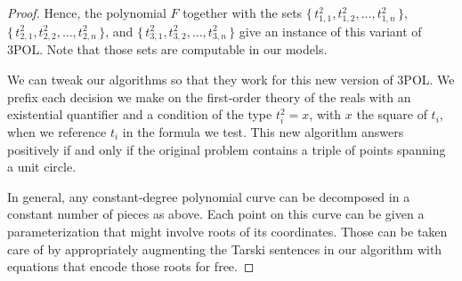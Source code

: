 \begin{proof}
	Hence, the polynomial \(F\) together with
	the sets
	$\{\,t_{1,1}^2,t_{1,2}^2,\ldots,t_{1,n}^2\,\}$,
	$\{\,t_{2,1}^2,t_{2,2}^2,\ldots,t_{2,n}^2\,\}$, and
	$\{\,t_{3,1}^2,t_{3,2}^2,\ldots,t_{3,n}^2\,\}$
	give an instance of this variant of 3POL\@.
	Note that those sets are computable in our models.

	We can tweak our algorithms so that they work for this new version of
	3POL\@. We prefix each decision we make on the first-order theory of the reals
	with an existential quantifier and a condition of the type $t_i^2=x$, with
	$x$ the square of $t_i$, when we reference $t_i$ in the formula we test.
%
	This new algorithm answers positively if and only if the original problem
	contains a triple of points spanning a unit circle.

	In general, any constant-degree polynomial curve can be decomposed in
	a constant number of pieces as above. Each point on this curve can be given a
	parameterization that might involve roots of its coordinates. Those can be
	taken care of by appropriately augmenting the Tarski sentences in our
	algorithm with equations that encode those roots for free.
\end{proof}
